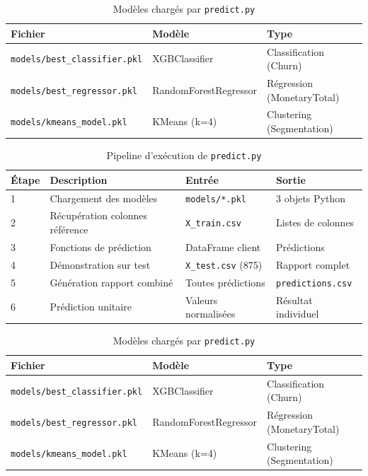 \documentclass[11pt,a4paper]{article}
\begin{document}
\begin{table}[H]
	\centering
	\caption{Modèles chargés par \texttt{predict.py}}
	\label{tab:models_loaded}
	\begin{tabular}{|l|l|l|}
		\hline
		\textbf{Fichier} & \textbf{Modèle} & \textbf{Type} \\
		\hline
		\texttt{models/best\_classifier.pkl} & XGBClassifier & Classification (Churn) \\
		\texttt{models/best\_regressor.pkl} & RandomForestRegressor & Régression (MonetaryTotal) \\
		\texttt{models/kmeans\_model.pkl} & KMeans (k=4) & Clustering (Segmentation) \\
		\hline
	\end{tabular}
\end{table}
\begin{table}[H]
	\centering
	\caption{Pipeline d'exécution de \texttt{predict.py}}
	\label{tab:pipeline_predict}
	\begin{tabular}{|l|l|l|l|}
		\hline
		\textbf{Étape} & \textbf{Description} & \textbf{Entrée} & \textbf{Sortie} \\
		\hline
		1 & Chargement des modèles & \texttt{models/*.pkl} & 3 objets Python \\
		2 & Récupération colonnes référence & \texttt{X\_train.csv} & Listes de colonnes \\
		3 & Fonctions de prédiction & DataFrame client & Prédictions \\
		4 & Démonstration sur test & \texttt{X\_test.csv} (875) & Rapport complet \\
		5 & Génération rapport combiné & Toutes prédictions & \texttt{predictions.csv} \\
		6 & Prédiction unitaire & Valeurs normalisées & Résultat individuel \\
		\hline
	\end{tabular}
\end{table}
\begin{table}[H]
	\centering
	\caption{Modèles chargés par \texttt{predict.py}}
	\label{tab:models_loaded}
	\begin{tabular}{|l|l|l|}
		\hline
		\textbf{Fichier} & \textbf{Modèle} & \textbf{Type} \\
		\hline
		\texttt{models/best\_classifier.pkl} & XGBClassifier & Classification (Churn) \\
		\texttt{models/best\_regressor.pkl} & RandomForestRegressor & Régression (MonetaryTotal) \\
		\texttt{models/kmeans\_model.pkl} & KMeans (k=4) & Clustering (Segmentation) \\
		\hline
	\end{tabular}
\end{table}
\end{document}

